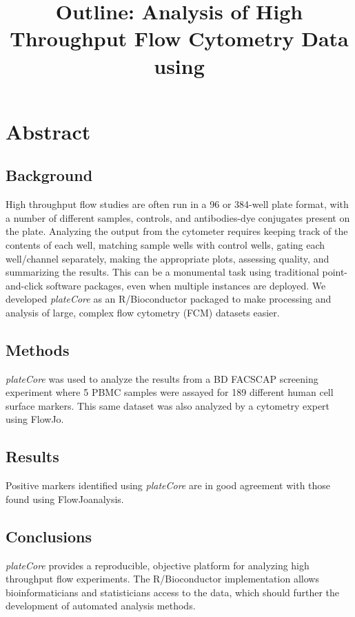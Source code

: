 \documentclass[12pt]{article}
\title{Outline: Analysis of High Throughput Flow Cytometry Data using \Rpackage{plateCore}}
\newcommand{\Rpackage}[1]{{\textit{#1}}}
\begin{document}
\maketitle

\clearpage
\section*{Abstract}
\subsection*{Background}
High throughput flow studies are often run in a 96 or 384-well plate format, with a number of different samples, 
controls, and antibodies-dye conjugates present on the plate. Analyzing the output from the cytometer requires keeping track of the contents
of each well, matching sample wells with control wells, gating each well/channel separately, making the appropriate plots, assessing quality, and
summarizing the results. This can be a monumental task using traditional point-and-click software packages, even when multiple instances are
deployed. We developed \Rpackage{plateCore} as an R/Bioconductor packaged to make processing and analysis of large, complex flow cytometry (FCM) datasets
easier. 

\subsection*{Methods}
\Rpackage{plateCore} was used to analyze the results from a BD FACS\texttrademark CAP screening experiment where 5 PBMC samples 
were assayed for 189 different human cell surface markers. 
This same dataset was also analyzed by a cytometry expert using FlowJo\texttrademark.

\subsection*{Results}
Positive markers identified using \Rpackage{plateCore} are in good agreement with those found using FlowJo\texttrademark analysis.

\subsection*{Conclusions}
\Rpackage{plateCore} provides a reproducible, objective platform for analyzing high throughput flow experiments. The R/Bioconductor 
implementation allows bioinformaticians and statisticians access to the data, which should further the development of automated
analysis methods.
\end{document}
